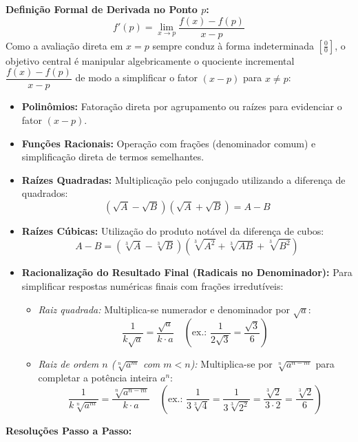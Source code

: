 \documentclass[12pt,a4paper]{article}
\begin{document}
\begin{recursosbox}[title=Estratégia Geral e Recursos Algébricos]
\textbf{Definição Formal de Derivada no Ponto $p$:}
\[
f'(p) = \lim_{x \to p} \frac{f(x) - f(p)}{x - p}
\]
Como a avaliação direta em $x = p$ sempre conduz à forma indeterminada $\left[\frac{0}{0}\right]$, o objetivo central é manipular algebricamente o quociente incremental $\dfrac{f(x) - f(p)}{x - p}$ de modo a simplificar o fator $(x - p)$ para $x \neq p$:
\begin{itemize}[noitemsep, topsep=2pt]
    \item \textbf{Polinômios:} Fatoração direta por agrupamento ou raízes para evidenciar o fator $(x - p)$.
    \item \textbf{Funções Racionais:} Operação com frações (denominador comum) e simplificação direta de termos semelhantes.
    \item \textbf{Raízes Quadradas:} Multiplicação pelo conjugado utilizando a diferença de quadrados:
    \[
    (\sqrt{A} - \sqrt{B})(\sqrt{A} + \sqrt{B}) = A - B
    \]
    \item \textbf{Raízes Cúbicas:} Utilização do produto notável da diferença de cubos:
    \[
    A - B = (\sqrt[3]{A} - \sqrt[3]{B})\left(\sqrt[3]{A^2} + \sqrt[3]{AB} + \sqrt[3]{B^2}\right)
    \]
    \item \textbf{Racionalização do Resultado Final (Radicais no Denominador):} Para simplificar respostas numéricas finais com frações irredutíveis:
    \begin{itemize}[noitemsep, topsep=1pt]
        \item \textit{Raiz quadrada:} Multiplica-se numerador e denominador por $\sqrt{a}$:
        \[
        \frac{1}{k\sqrt{a}} = \frac{\sqrt{a}}{k \cdot a} \quad \left(\text{ex.: } \frac{1}{2\sqrt{3}} = \frac{\sqrt{3}}{6}\right)
        \]
        \item \textit{Raiz de ordem $n$ ($\sqrt[n]{a^m}$ com $m < n$):} Multiplica-se por $\sqrt[n]{a^{n - m}}$ para completar a potência inteira $a^n$:
        \[
        \frac{1}{k\sqrt[n]{a^m}} = \frac{\sqrt[n]{a^{n - m}}}{k \cdot a} \quad \left(\text{ex.: } \frac{1}{3\sqrt[3]{4}} = \frac{1}{3\sqrt[3]{2^2}} = \frac{\sqrt[3]{2}}{3 \cdot 2} = \frac{\sqrt[3]{2}}{6}\right)
        \]
    \end{itemize}
\end{itemize}
\end{recursosbox}

\vspace{0.4cm}
\textbf{Resoluções Passo a Passo:}
\end{document}
